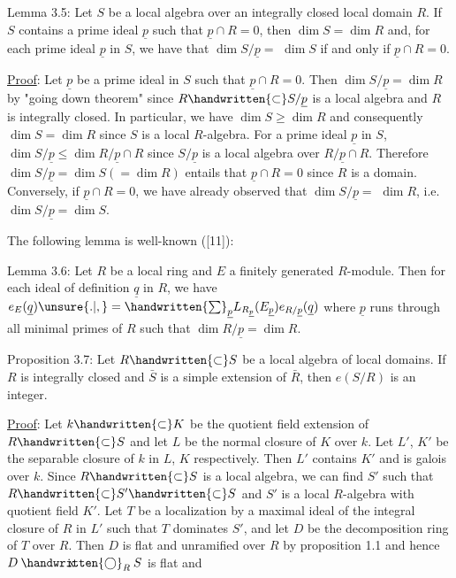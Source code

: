 Lemma 3.5: Let $S$ be a local algebra over an integrally closed local
domain $R$. If $S$ contains a prime ideal $\underline p$ such that $\underline p\cap R=0$, then
$\dim S=\dim R$ and, for each prime ideal $\underline p$ in $S$, we have that $\dim S/\underline p=$
$\dim S$ if and only if $\underline p\cap R=0$.

\uline{Proof}: Let $\underline p$ be a prime ideal in $S$ such that $\underline p\cap R=0$. Then
$\dim S/\underline p=\dim R$ by "going down theorem" since $R\handwritten{\subset} S/\underline p$ is a local algebra
and $R$ is integrally closed. In particular, we have $\dim S\geq\dim R$ and
consequently $\dim S=\dim R$ since $S$ is a local $R$-algebra. For a prime ideal
$\underline p$ in $S$, $\dim S/\underline p\leq\dim R/\underline p\cap R$ since $S/\underline p$ is a local algebra over $R/\underline p\cap R$.
Therefore $\dim S/\underline p=\dim S(=\dim R)$ entails that $\underline p\cap R=0$ since $R$ is a
domain. Conversely, if $\underline p\cap R=0$, we have already observed that $\dim S/\underline p=$
$\dim R$, i.e. $\dim S/\underline p=\dim S$.\hfill\unsure{;|:}

The following lemma is well-known ([11]):

Lemma 3.6: Let $R$ be a local ring and $E$ a finitely generated $R$-module.
Then for each ideal of definition $\underline q$ in $R$, we have $e_E(\underline q)\unsure{.|,}=
\handwritten{\sum}_{\underline p} L_{R_{\underline p}}(E_{\underline p})e_{R/\underline p}(\underline q)$
where $\underline p$ runs through all minimal primes of $R$ such that $\dim R/\underline p=\dim R$.

Proposition 3.7: Let $R\handwritten{\subset} S$ be a local algebra of local domains. If
$R$ is integrally closed and $\bar S$ is a simple extension of $\bar R$, then $e(S/R)$ is
an integer.

\uline{Proof}: Let $k\handwritten{\subset} K$ be the quotient field extension of $R\handwritten{\subset} S$ and let $L$
be the normal closure of $K$ over $k$. Let $L'$, $K'$ be the separable closure
of $k$ in $L$, $K$ respectively. Then $L'$ contains $K'$ and is galois over $k$.
Since $R\handwritten{\subset} S$ is a local algebra, we can find $S'$ such that $R\handwritten{\subset} S'\handwritten{\subset} S$ and $S'$
is a local $R$-algebra with quotient field $K'$. Let $T$ be a localization by a
maximal ideal of the integral closure of $R$ in $L'$ such that $T$ dominates $S'$,
and let $D$ be the decomposition ring of $T$ over $R$. Then $D$ is flat and
unramified over $R$ by proposition 1.1 and hence $D\mathbin{\ooalign{\hfil$\mathrm{x}$\hfil\cr\hfil$\handwritten{\bigcirc}$\hfil\cr}}_R S$ is flat and
